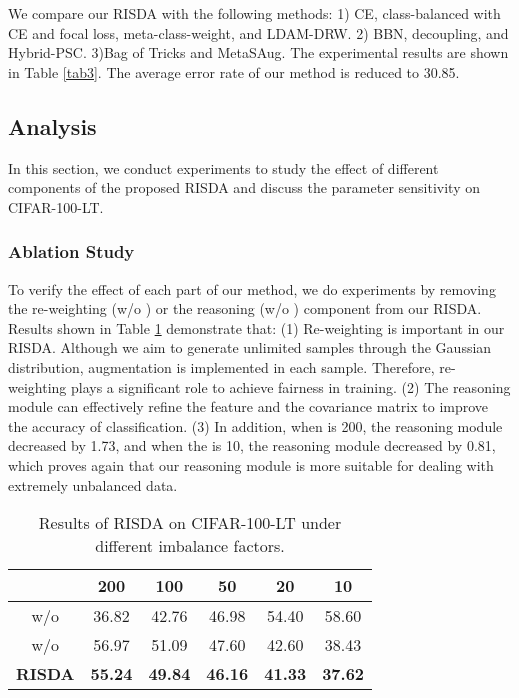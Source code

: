 \documentclass[letterpaper]{article} \usepackage{aaai22}  \usepackage{times}  \usepackage{helvet}  \usepackage{courier}  \usepackage[hyphens]{url}  \usepackage{graphicx} \usepackage{bm}
\begin{document}
	We compare our RISDA with the following methods: 1) CE, class-balanced with CE and focal loss, meta-class-weight, and LDAM-DRW. 2) BBN, decoupling, and Hybrid-PSC. 3)Bag of Tricks and MetaSAug. The experimental results are shown in Table  \ref{tab3}. The average error rate of our method is reduced to 30.85.
	
	
	\subsection{Analysis}
	In this section, we conduct experiments to study the effect of different components of the proposed RISDA and discuss the parameter sensitivity on CIFAR-100-LT.
	
	\subsubsection{Ablation Study}
	
	To verify the effect of each part of our method, we do experiments by removing the re-weighting (w/o )  or the reasoning (w/o ) component from our RISDA. Results shown in Table \ref{tab4} demonstrate that: (1) Re-weighting is important in our RISDA. Although we aim to generate unlimited samples through the Gaussian distribution, augmentation is implemented in each sample. Therefore, re-weighting plays a significant role to achieve fairness in training. (2) The reasoning module can effectively refine the feature and the covariance matrix to improve the accuracy of classification. (3) In addition, when  is 200, the reasoning module decreased by 1.73, and when the  is 10, the reasoning module decreased by 0.81, which proves again that our reasoning module is more suitable for dealing with extremely unbalanced data.
	


	\begin{table}[!ht]
\centering
		\begin{tabular}{cccccc}
			\toprule
			 & 200   & 100   & 50    & 20    & 10    \\ 
			\midrule
			w/o  & 36.82      &42.76       &46.98       &54.40       &58.60       \\ 
			w/o     & 56.97 & 51.09 & 47.60  & 42.60  & 38.43 \\ 
			\textbf{RISDA}                                 &\textbf{55.24}       &\textbf{49.84}       &\textbf{46.16}       &\textbf{41.33}         &\textbf{37.62}       \\ 
			\bottomrule
		\end{tabular}
		\caption{Results of RISDA on CIFAR-100-LT under different imbalance factors.}
		\label{tab4}
	\end{table}
	
\end{document}
